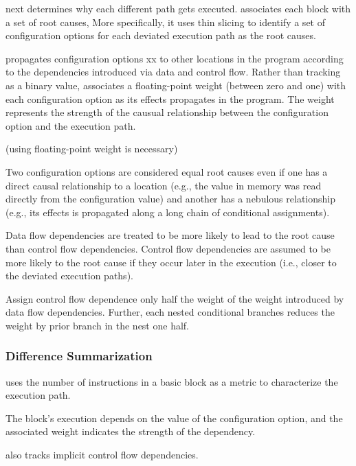 \ourtool next determines why each different path
gets executed. \ourtool associates each block
with a set of root causes, More specifically,
it uses thin slicing to identify a
set of configuration options for each deviated
execution path as the root causes.


\ourtool propagates configuration options xx to
other locations in the program according to the
dependencies introduced via data and control flow.
Rather than tracking as a binary value, \ourtool
associates a floating-point weight (between
zero and one) with each configuration option
as its effects propagates in the program.
The weight represents the strength of the causual
relationship between the configuration option
and the execution path.

(using floating-point weight is necessary)

Two configuration options are considered equal
root causes even if one has a direct causal
relationship to a location (e.g., the value
in memory was read directly from the configuration value)
and another has a nebulous relationship (e.g., 
its effects is propagated along a long chain
of conditional assignments).

Data flow dependencies are treated to be more likely
to lead to the root cause than control flow
dependencies. Control flow dependencies are assumed
to be more likely to the root cause if they occur
later in the execution (i.e., closer to the
deviated execution paths).

Assign control flow dependence only half the weight
of the weight introduced by data flow dependencies.
Further, each nested conditional branches reduces
the weight by prior branch in the nest one half.

\subsubsection{Difference Summarization}




\ourtool uses the number of instructions in a basic
block as a metric to characterize the execution path.

The block's execution depends on the value of
the configuration option, and the associated weight
indicates the strength of the dependency.


\ourtool also tracks implicit control flow dependencies.

